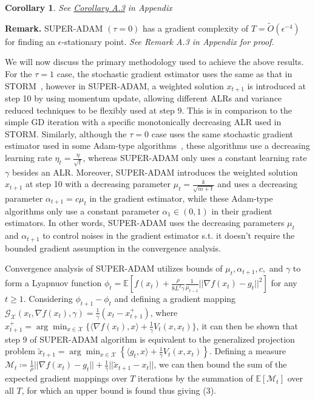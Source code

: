 \documentclass{article}
\newtheorem{corollary}{Corollary}[section]
\begin{document}
\begin{corollary}
	See \hyperref[coro51appendix]{Corollary A.3} in Appendix
\end{corollary}
\textbf{Remark.} SUPER-ADAM $(\tau = 0)$ has a gradient complexity of $T = \tilde{O}(\epsilon^{-4})$ for finding an $\epsilon$-stationary point. \textit{See Remark A.3 in Appendix for proof.}

We will now discuss the primary methodology used to achieve the above results. For the $\tau = 1$ case, the stochastic gradient estimator uses the same as that in STORM~\cite{https://doi.org/10.48550/arxiv.1905.10018}, however in SUPER-ADAM, a weighted solution $x_{t+1}$ is introduced at step 10 by
using momentum update, allowing different ALRs and variance reduced techniques to be flexibly used at step 9. This is in comparison to the simple GD iteration with a specific monotonically decreasing ALR used in STORM. Similarly, although the $\tau = 0$ case uses the
same stochastic gradient estimator used in some Adam-type algorithms~\cite{https://doi.org/10.48550/arxiv.1412.6980, https://doi.org/10.48550/arxiv.1904.09237, https://doi.org/10.48550/arxiv.2010.07468}, these algorithms use a decreasing learning rate
$\eta_t = \frac{\eta}{\sqrt{t}}$, whereas SUPER-ADAM only uses a constant learning rate $\gamma$ besides an ALR. Moreover, SUPER-ADAM introduces the weighted solution $x_{t+1}$ at step 10 with a decreasing
parameter $\mu_t = \frac{k}{\sqrt{m+t}}$ and uses a decreasing parameter $\alpha_{t+1} = c\mu_t$ in the gradient estimator, while these Adam-type algorithms only use a constant parameter $\alpha_1\in (0,1)$ in their gradient estimators. In other words, SUPER-ADAM uses the
decreasing parameters $\mu_t$ and $\alpha_{t+1}$ to control noises in the gradient estimator s.t. it doesn't require the bounded gradient assumption in the convergence analysis.

Convergence analysis of SUPER-ADAM utilizes bounds of $\mu_t, \alpha_{t+1}, c,$ and $\gamma$ to form a Lyapnuov function $\phi_t = \mathbb{E}[f(x_t) + \frac{\rho}{8L^2 \gamma}\frac{1}{\mu_{t-1}}||\nabla f(x_t) - g_t||^2]$ for any $t\geq 1$. Considering
$\phi_{t+1} - \phi_t$ and defining a gradient mapping $\mathcal{G}_{\mathcal{X}}(x_t, \nabla f(x_t),\gamma) = \frac{1}{\gamma}(x_t - x^+_{t+1})$, where $x^+_{t+1} = \arg\min_{x\in\mathcal{X}}\{\langle\nabla f(x_t), x\rangle + \frac{1}{\gamma} V_t(x,x_t)\}$,
it can then be shown that step 9 of SUPER-ADAM algorithm is equivalent to the generalized projection problem $\tilde{x}_{t+1} = \arg\min_{x\in\mathcal{X}}\left\{\langle g_t, x\rangle + \frac{1}{\gamma}V_t (x,x_t)\right\}$.
Defining a measure $\mathcal{M}_t\coloneqq\frac{1}{\rho}||\nabla f(x_t) - g_t|| + \frac{1}{\gamma}||\tilde{x}_{t+1} - x_t||$,
we can then bound the sum of the expected gradient mappings over $T$ iterations by the summation of $\mathbb{E}[\mathcal{M}_t]$ over all $T$, for which an upper bound is found thus giving (3).
\end{document}
